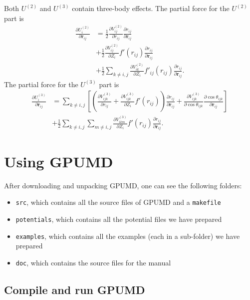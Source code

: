 \documentclass[12pt,a4paper]{report}
\newcommand{\vect}[1]{\boldsymbol{#1}}
\begin{document}
Both $U^{(2)}$ and $U^{(3)}$ contain three-body effects. The partial force for the $U^{(2)}$ part is
\begin{align}
\frac{\partial U^{(2)}_i}{\partial \vect{r}_{ij}}
&= \frac{1}{2} \frac{\partial V^{(2)}_{ij}}{\partial r_{ij}} \frac{\partial r_{ij}}{\partial \vect{r}_{ij}} \nonumber \\
&+ \frac{1}{2} \frac{\partial V^{(2)}_{ij}}{\partial Z_{i}} f'(r_{ij}) \frac{\partial r_{ij}}{\partial \vect{r}_{ij}} \nonumber \\
&+ \frac{1}{2} \sum_{k\neq i,j} \frac{\partial V^{(2)}_{ik}}{\partial Z_{i}} f'_{ij}(r_{ij}) \frac{\partial r_{ij}}{\partial \vect{r}_{ij}}.
\end{align}
The partial force for the $U^{(3)}$ part is
\begin{align}
\frac{\partial U^{(3)}_i}{\partial \vect{r}_{ij}}
&= \sum_{k\neq i,j} 
\left[
\left( \frac{\partial V^{(3)}_{ijk}}{\partial r_{ij}} + \frac{\partial V^{(3)}_{ijk}}{\partial Z_{i}} f'(r_{ij} ) \right)
\frac{\partial r_{ij}}{\partial \vect{r}_{ij}}
+ \frac{\partial V^{(3)}_{ijk}}{\partial \cos\theta_{ijk}} \frac{\partial \cos\theta_{ijk}}{\partial \vect{r}_{ij}} 
\right]
 \nonumber \\
&+ \frac{1}{2} \sum_{k\neq i,j} \sum_{m\neq i,j} \frac{\partial V^{(3)}_{ikm}}{\partial Z_{i}} f'(r_{ij}) \frac{\partial r_{ij}}{\partial \vect{r}_{ij}}.
\end{align}



\chapter{Using GPUMD \label{chapter:usage}}

After downloading and unpacking GPUMD, one can see the following folders:
\begin{itemize}
\item \verb"src", which contains all the source files of GPUMD and a \verb"makefile"
\item \verb"potentials", which contains all the potential files we have prepared
\item \verb"examples", which contains all the examples (each in a sub-folder) we have prepared
\item \verb"doc", which contains the source files for the manual
\end{itemize}


\section{Compile and run GPUMD}
\end{document}
